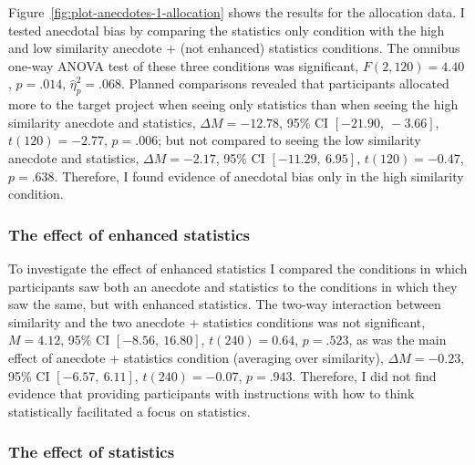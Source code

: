 \documentclass[a4paper, nobind, dvipsnames]{templates/ociamthesis}
\theoremstyle{definition}
\theoremstyle{definition}
\theoremstyle{definition}
\theoremstyle{definition}
\theoremstyle{remark}
\begin{document}
Figure~\ref{fig:plot-anecdotes-1-allocation} shows the results for the
allocation data. I tested anecdotal bias by comparing the statistics only
condition with the high and low similarity anecdote + (not enhanced) statistics
conditions. The omnibus one-way ANOVA test of these three conditions was
significant, \(F(2, 120) = 4.40\), \(p = .014\), \(\hat{\eta}^2_p = .068\). Planned comparisons
revealed that participants allocated more to the target project when seeing only
statistics than when seeing the high similarity anecdote and statistics,
\(\Delta M = -12.78\), 95\% CI \([-21.90,~-3.66]\), \(t(120) = -2.77\), \(p = .006\); but not compared
to seeing the low similarity anecdote and statistics,
\(\Delta M = -2.17\), 95\% CI \([-11.29,~6.95]\), \(t(120) = -0.47\), \(p = .638\). Therefore, I
found evidence of anecdotal bias only in the high similarity condition.

\hypertarget{the-effect-of-enhanced-statistics}{%
\subsubsection{The effect of enhanced statistics}\label{the-effect-of-enhanced-statistics}}

To investigate the effect of enhanced statistics I compared the conditions in
which participants saw both an anecdote and statistics to the conditions in
which they saw the same, but with enhanced statistics. The two-way interaction
between similarity and the two anecdote + statistics conditions was not
significant, \(M = 4.12\), 95\% CI \([-8.56,~16.80]\), \(t(240) = 0.64\), \(p = .523\), as
was the main effect of anecdote + statistics condition (averaging over
similarity), \(\Delta M = -0.23\), 95\% CI \([-6.57,~6.11]\), \(t(240) = -0.07\), \(p = .943\). Therefore, I
did not find evidence that providing participants with instructions with how to
think statistically facilitated a focus on statistics.

\hypertarget{the-effect-of-statistics}{%
\subsubsection{The effect of statistics}\label{the-effect-of-statistics}}
\end{document}
